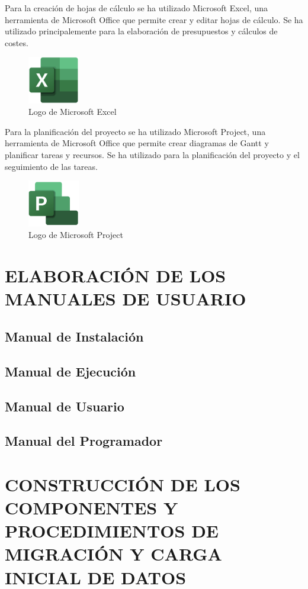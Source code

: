 Para la creación de hojas de cálculo se ha utilizado Microsoft Excel\cite{excel}, una herramienta de Microsoft Office que permite crear y editar hojas de cálculo.
Se ha utilizado principalemente para la elaboración de presupuestos y cálculos de costes.

\begin{figure}[H]
    \centering
    \includegraphics[width=0.2\textwidth]{figures/7-Construccion/Excel.png}
    \caption{Logo de Microsoft Excel}
\end{figure}

Para la planificación del proyecto se ha utilizado Microsoft Project\cite{project}, una herramienta de Microsoft Office que permite crear diagramas de Gantt y planificar tareas y recursos.
Se ha utilizado para la planificación del proyecto y el seguimiento de las tareas.

\begin{figure}[H]
    \centering
    \includegraphics[width=0.2\textwidth]{figures/7-Construccion/Project.png}
    \caption{Logo de Microsoft Project}
\end{figure}



\newpage
\section{ELABORACIÓN DE LOS MANUALES DE USUARIO}

\subsection{Manual de Instalación} 

\subsection{Manual de Ejecución} 

\subsection{Manual de Usuario} 

\subsection{Manual del Programador}


\newpage
\section{CONSTRUCCIÓN DE LOS COMPONENTES Y PROCEDIMIENTOS DE MIGRACIÓN Y CARGA INICIAL DE DATOS}

